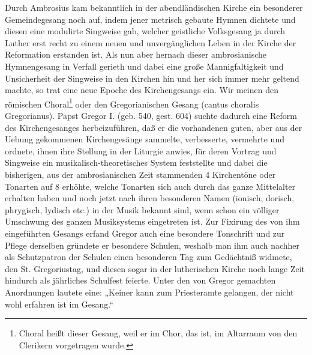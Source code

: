 Durch Ambrosius kam bekanntlich in der abendländischen Kirche ein besonderer Gemeindegesang noch auf, indem jener metrisch gebaute Hymnen
dichtete und diesen eine modulirte Singweise gab, welcher geistliche Volksgesang ja durch Luther erst recht zu einem neuen und unvergänglichen Leben in der Kirche der Reformation erstanden ist. Als nun aber hernach dieser ambrosianische Hymnengesang in Verfall gerieth und dabei eine große Mannigfaltigkeit und Unsicherheit der Singweise in den Kirchen hin und her sich immer mehr geltend machte, so trat eine neue Epoche des Kirchengesangs ein. Wir meinen den römischen Choral\footnote{Choral heißt dieser Gesang, weil er im Chor, das ist, im Altarraum von den Clerikern vorgetragen wurde.} oder den Gregorianischen Gesang (cantus choralis Gregorianus). Papst Gregor I. (geb. 540, gest. 604) suchte dadurch eine Reform des Kirchengesanges herbeizuführen, daß er die vorhandenen guten, aber aus der Uebung gekommenen Kirchengesänge sammelte, verbesserte, vermehrte und ordnete, ihnen ihre Stellung in der Liturgie anwies, für deren Vortrag und Singweise ein musikalisch-theoretisches System feststellte und dabei die bisherigen, aus der ambrosianischen Zeit stammenden 4 Kirchentöne oder Tonarten auf 8 erhöhte, welche Tonarten sich auch durch das ganze Mittelalter erhalten haben und noch jetzt nach ihren besonderen Namen (ionisch, dorisch, phrygisch, lydisch etc.) in der Musik bekannt sind, wenn schon ein völliger Umschwung des ganzen Musiksystems eingetreten ist. Zur Fixirung des von ihm eingeführten Gesangs erfand Gregor auch eine besondere Tonschrift und zur Pflege derselben gründete er besondere Schulen, weshalb man ihm auch nachher als Schutzpatron der Schulen einen besonderen Tag zum Gedächtniß widmete, den St. Gregoriustag, und diesen sogar in der lutherischen Kirche noch lange Zeit hindurch als jährliches Schulfest feierte. Unter den von Gregor gemachten Anordnungen lautete eine: „Keiner kann zum Priesteramte gelangen, der nicht wohl erfahren ist im Gesang.“


